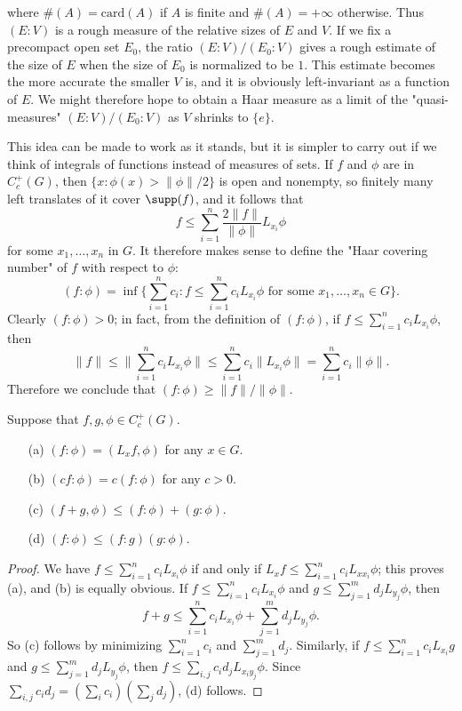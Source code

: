 where $\#(A)=\mathrm{card}(A)$ if $A$ is finite and $\#(A)=+\infty$ otherwise. Thus $(E:V)$ is a rough measure of the relative sizes of $E$ and $V$. If we fix a precompact open set $E_0$, the ratio $(E:V)/(E_0:V)$ gives a rough estimate of the size of $E$ when the size of $E_0$ is normalized to be $1$. This estimate becomes the more accurate the smaller $V$ is, and it is obviously left-invariant as a function of $E$. We might therefore hope to obtain a Haar measure as a limit of the "quasi-measures" $(E:V)/(E_0:V)$ as $V$ shrinks to $\{e\}$.\par
This idea can be made to work as it stands, but it is simpler to carry out if we think of integrals of functions instead of measures of sets. If $f$ and $\phi$ are in $C_c^+(G)$, then $\{x:\phi(x)>\|\phi\|/2\}$ is open and nonempty, so finitely many left translates of it cover $\supp(f)$, and it follows that
\[f\leq\sum_{i=1}^{n}\frac{2\|f\|}{\|\phi\|}L_{x_i}\phi\]
for some $x_1,\dots,x_n$ in $G$. It therefore makes sense to define the "Haar covering number" of $f$ with respect to $\phi$:
\[(f:\phi)=\inf\Big\{\sum_{i=1}^{n}c_i:f\leq\sum_{i=1}^{n}c_iL_{x_i}\phi\text{ for some $x_1,\dots,x_n\in G$}\Big\}.\]
Clearly $(f:\phi)>0$; in fact, from the definition of $(f:\phi)$, if $f\leq\sum_{i=1}^{n}c_iL_{x_i}\phi$, then
\[\|f\|\leq\Big\|\sum_{i=1}^{n}c_iL_{x_i}\phi\Big\|\leq\sum_{i=1}^{n}c_i\|L_{x_i}\phi\|=\sum_{i=1}^{n}c_i\|\phi\|.\]
Therefore we conclude that $(f:\phi)\geq\|f\|/\|\phi\|$.
\begin{lemma}\label{Haar covering number lemma}
Suppose that $f,g,\phi\in C_c^+(G)$.
\begin{itemize}
\item[(a)] $(f:\phi)=(L_xf,\phi)$ for any $x\in G$.
\item[(b)] $(cf:\phi)=c(f:\phi)$ for any $c>0$.
\item[(c)] $(f+g,\phi)\leq(f:\phi)+(g:\phi)$.
\item[(d)] $(f:\phi)\leq(f:g)(g:\phi)$.
\end{itemize}
\end{lemma}
\begin{proof}
We have $f\leq\sum_{i=1}^{n}c_iL_{x_i}\phi$ if and only if $L_xf\leq\sum_{i=1}^{n}c_iL_{xx_i}\phi$; this proves (a), and (b) is equally obvious. If $f\leq\sum_{i=1}^{n}c_iL_{x_i}\phi$ and $g\leq\sum_{j=1}^{m}d_jL_{y_j}\phi$, then 
\[f+g\leq\sum_{i=1}^{n}c_iL_{x_i}\phi+\sum_{j=1}^{m}d_jL_{y_j}\phi.\]
So (c) follows by minimizing $\sum_{i=1}^{n}c_i$ and $\sum_{j=1}^{m}d_j$. Similarly, if $f\leq\sum_{i=1}^{n}c_iL_{x_i}g$ and $g\leq\sum_{j=1}^{m}d_jL_{y_j}\phi$, then $f\leq\sum_{i,j}c_id_j L_{x_iy_j}\phi$. Since $\sum_{i,j}c_id_j=(\sum_ic_i)(\sum_jd_j)$, (d) follows.
\end{proof}
